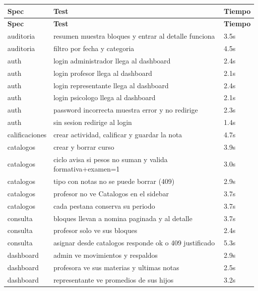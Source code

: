 \documentclass[11pt,a4paper]{article}
\begin{document}
{\small
\begin{longtable}{|p{}|p{}|p{}|}
\rowcolor{UTECblue}\color{white}\bfseries Spec & \color{white}\bfseries Test & \color{white}\bfseries Tiempo \\ \hline
\endfirsthead
\rowcolor{UTECblue}\color{white}\bfseries Spec & \color{white}\bfseries Test & \color{white}\bfseries Tiempo \\ \hline
\endhead
auditoria & resumen muestra bloques y entrar al detalle funciona & 3.5s \\ \hline
auditoria & filtro por fecha y categoria & 4.5s \\ \hline
auth & login administrador llega al dashboard & 2.4s \\ \hline
auth & login profesor llega al dashboard & 2.1s \\ \hline
auth & login representante llega al dashboard & 2.4s \\ \hline
auth & login psicologo llega al dashboard & 2.1s \\ \hline
auth & password incorrecta muestra error y no redirige & 2.3s \\ \hline
auth & sin sesion redirige al login & 1.4s \\ \hline
calificaciones & crear actividad, calificar y guardar la nota & 4.7s \\ \hline
catalogos & crear y borrar curso & 3.9s \\ \hline
catalogos & ciclo avisa si pesos no suman y valida formativa+examen=1 & 3.0s \\ \hline
catalogos & tipo con notas no se puede borrar (409) & 2.9s \\ \hline
catalogos & profesor no ve Catalogos en el sidebar & 3.7s \\ \hline
catalogos & cada pestana conserva su periodo & 3.7s \\ \hline
consulta & bloques llevan a nomina paginada y al detalle & 3.7s \\ \hline
consulta & profesor solo ve sus bloques & 2.4s \\ \hline
consulta & asignar desde catalogos responde ok o 409 justificado & 5.3s \\ \hline
dashboard & admin ve movimientos y respaldos & 2.9s \\ \hline
dashboard & profesora ve sus materias y ultimas notas & 2.5s \\ \hline
dashboard & representante ve promedios de sus hijos & 3.2s \\ \hline

\end{longtable}}
\end{document}
